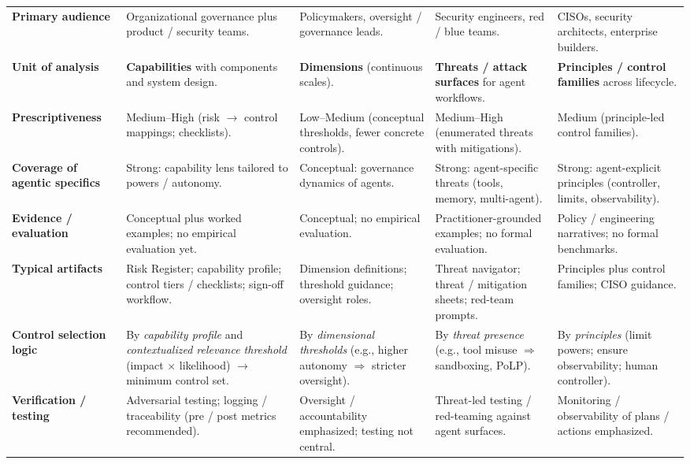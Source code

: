 \documentclass{article}
\begin{document}
{\begin{longtable}{P{0.18\textwidth} P{0.19\textwidth} P{0.19\textwidth} P{0.19\textwidth} P{0.19\textwidth}}
\textbf{Primary audience} &
Organizational governance plus product / security teams. &
Policymakers, oversight / governance leads. &
Security engineers, red / blue teams. &
CISOs, security architects, enterprise builders. \\

\textbf{Unit of analysis} &
\textbf{Capabilities} with components and system design. &
\textbf{Dimensions} (continuous scales). &
\textbf{Threats / attack surfaces} for agent workflows. &
\textbf{Principles / control families} across lifecycle. \\

\textbf{Prescriptiveness} &
Medium--High (risk $\to$ control mappings; checklists). &
Low--Medium (conceptual thresholds, fewer concrete controls). &
Medium--High (enumerated threats with mitigations). &
Medium (principle-led control families). \\

\textbf{Coverage of agentic specifics} &
Strong: capability lens tailored to powers / autonomy. &
Conceptual: governance dynamics of agents. &
Strong: agent-specific threats (tools, memory, multi-agent). &
Strong: agent-explicit principles (controller, limits, observability). \\

\textbf{Evidence / evaluation} &
Conceptual plus worked examples; no empirical evaluation yet. &
Conceptual; no empirical evaluation. &
Practitioner-grounded examples; no formal evaluation. &
Policy / engineering narratives; no formal benchmarks. \\

\textbf{Typical artifacts} &
Risk Register; capability profile; control tiers / checklists; sign-off workflow. &
Dimension definitions; threshold guidance; oversight roles. &
Threat navigator; threat / mitigation sheets; red-team prompts. &
Principles plus control families; CISO guidance. \\

\textbf{Control selection logic} &
By \emph{capability profile} and \emph{contextualized relevance threshold} (impact $\times$ likelihood) $\to$ minimum control set. &
By \emph{dimensional thresholds} (e.g., higher autonomy $\Rightarrow$ stricter oversight). &
By \emph{threat presence} (e.g., tool misuse $\Rightarrow$ sandboxing, PoLP). &
By \emph{principles} (limit powers; ensure observability; human controller). \\

\textbf{Verification / testing} &
Adversarial testing; logging / traceability (pre / post metrics recommended). &
Oversight / accountability emphasized; testing not central. &
Threat-led testing / red-teaming against agent surfaces. &
Monitoring / observability of plans / actions emphasized. \\


\end{longtable}}
\end{document}
